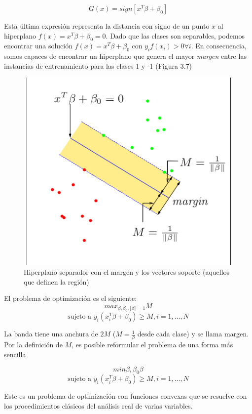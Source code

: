 $$G(x) = sign[x^T \beta + \beta_0]$$


Esta última expresión representa la distancia con signo de un punto $x$ al hiperplano $f(x) = x^T \beta + \beta_0=0$. Dado que las clases son separables, podemos encontrar una solución $f(x) = x^T \beta + \beta_0$ con $y_if(x_i) > 0 \forall i$. En consecuencia, somos capaces de encontrar un hiperplano que genera el mayor \textit{margen} entre las instancias de entrenamiento para las clases 1 y -1 (Figura 3.7)

\begin{figure}[H] %
	\centering
	\includegraphics[scale=0.5]{hip.png}  %
	\caption{Hiperplano separador con el margen y los vectores soporte (aquellos que definen la región)} 
	\label{fig:hip}
\end{figure}

El problema de optimización es el siguiente: 
$$max_{\beta, \beta_0, \Vert \beta \Vert = 1} M$$
$$\text{sujeto a } y_i(x_i^T\beta + \beta_0) \geq M, i=1,\dots,N$$

La banda tiene una anchura de $2M$ ($M = \frac{1}{\beta}$ desde cada clase) y se llama margen. Por la definición de $M$, es posible reformular el problema de una forma más sencilla

$$min{\beta, \beta_0} \beta$$
$$\text{sujeto a } y_i(x_i^T\beta + \beta_0) \geq M, i=1,\dots,N$$

Este es un problema de optimización con funciones convexas que se resuelve con los procedimientos clásicos del análisis real de varias variables. \\

